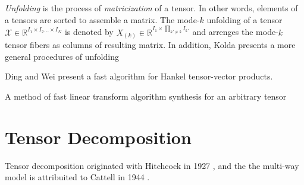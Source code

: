 \documentclass[letterpaper,12pt]{article}
\begin{document}
\textit{Unfolding} is the process of \textit{matricization} of a tensor. In other words, elements of a tensors are sorted to assemble a matrix. The mode-$k$ unfolding of a tensor $\mathcal{X}\in \mathbb{R}^{I_1\times I_2 \ldots \times I_N}$ is denoted by
 $X_{(k)} \in \mathbb{R}^{I_1\times \prod_{k'\neq k}I_{k'} }$ and arrenges the mode-$k$ tensor fibers as columns of resulting matrix. In addition, Kolda \cite{Kolda2009} presents a more general procedures of unfolding









Ding and Wei \cite{Ding2015} present a fast algorithm for Hankel tensor-vector products.

\cite{Dourbal2016} A method of fast linear transform algorithm synthesis for an arbitrary tensor

\section{Tensor Decomposition}


Tensor decomposition originated with Hitchcock in 1927 \cite{Hitchcock1927}, and the the multi-way model is attribuited to Cattell in 1944 \cite{Cattell1944}.
\end{document}
